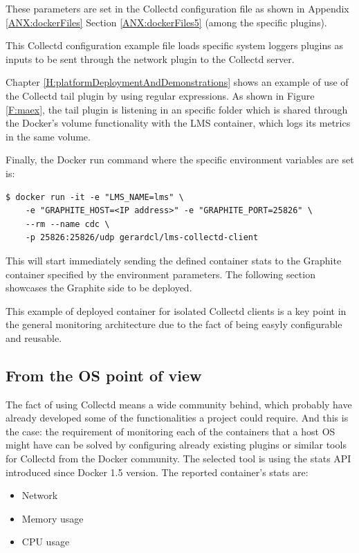 These parameters are set in the Collectd configuration file as shown in Appendix \ref{ANX:dockerFiles} Section \ref{ANX:dockerFiles5} (among the specific plugins).

This Collectd configuration example file loads specific system loggers plugins as inputs to be sent through the network plugin to the Collectd server.

Chapter \ref{H:platformDeploymentAndDemonstrations} shows an example of use of the Collectd tail plugin by using regular expressions. As shown in Figure \ref{F:maex}, the tail plugin is listening in an specific folder which is shared through the Docker's volume functionality with the LMS container, which logs its metrics in the same volume.

Finally, the Docker run command where the specific environment variables are set is:
\begin{verbatim}
$ docker run -it -e "LMS_NAME=lms" \
	-e "GRAPHITE_HOST=<IP address>" -e "GRAPHITE_PORT=25826" \
	--rm --name cdc \
	-p 25826:25826/udp gerardcl/lms-collectd-client
\end{verbatim}

This will start immediately sending the defined container stats to the Graphite container specified by the environment parameters. The following section showcases the Graphite side to be deployed.

This example of deployed container for isolated Collectd clients is a key point in the general monitoring architecture due to the fact of being easyly configurable and reusable.

\subsection{From the OS point of view}

The fact of using Collectd means a wide community behind, which probably have already developed some of the functionalities a project could require. And this is the case: the requirement of monitoring each of the containers that a host OS might have can be solved by configuring already existing plugins or similar tools for Collectd from the Docker community. The selected tool is using the stats API introduced since Docker 1.5 version. The reported container's stats are:
 
\begin{itemize}
\item Network
\item Memory usage
\item CPU usage
\end{itemize}

